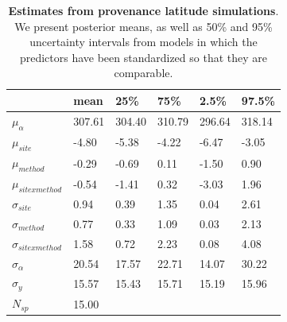 \documentclass{article}\usepackage[]{graphicx}\usepackage[]{color}
\begin{document}
\begin{table}[ht]
\centering
\caption{\textbf{Estimates from provenance latitude simulations}. We present posterior means, as well as 50\% and 95\% uncertainty intervals from models in which the predictors have been standardized so that they are comparable.} 
\label{tab:prov}
\begingroup\footnotesize
\begin{tabular}{|p{}|p{}p{}p{}p{}p{}|}
  \hline
 & mean & 25\% & 75\% & 2.5\% & 97.5\% \\ 
  \hline
$\mu_{\alpha}$ & 307.61 & 304.40 & 310.79 & 296.64 & 318.14 \\ 
  $\mu_{site}$ & -4.80 & -5.38 & -4.22 & -6.47 & -3.05 \\ 
  $\mu_{method}$ & -0.29 & -0.69 & 0.11 & -1.50 & 0.90 \\ 
  $\mu_{sitexmethod}$ & -0.54 & -1.41 & 0.32 & -3.03 & 1.96 \\ 
  $\sigma_{site}$ & 0.94 & 0.39 & 1.35 & 0.04 & 2.61 \\ 
  $\sigma_{method}$ & 0.77 & 0.33 & 1.09 & 0.03 & 2.13 \\ 
  $\sigma_{sitexmethod}$ & 1.58 & 0.72 & 2.23 & 0.08 & 4.08 \\ 
  $\sigma_{\alpha}$ & 20.54 & 17.57 & 22.71 & 14.07 & 30.22 \\ 
  $\sigma_{y}$ & 15.57 & 15.43 & 15.71 & 15.19 & 15.96 \\ 
   \hline
$N_{sp}$ & 15.00 &  &  &  &  \\ 
   \hline
\end{tabular}
\endgroup
\end{table}
\end{document}
